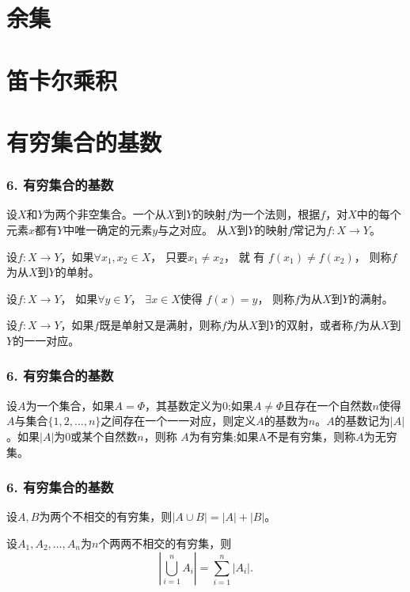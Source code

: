 \documentclass{beamer}
\begin{document}
\begin{CJK*}{UTF8}{gbsn}
\section{余集}
\section{笛卡尔乘积}
\section{有穷集合的基数}
\begin{frame}
  \frametitle{6. 有穷集合的基数}
  \begin{Def}
    设$X$和$Y$为两个非空集合。一个从$X$到$Y$的\alert{映射}$f$为一个法则，根据$f$，对$X$中的每个元素$x$都有$Y$中唯一确定的元素$y$与之对应。
    从$X$到$Y$的映射$f$常记为$f:X\to Y$。
  \end{Def}
    \begin{Def}
    设$f:X\to Y$，如果$\forall x_1, x_2 \in X$， 只要$x_1 \neq x_2$，  就 有 $f(x_1) \neq f(x_2)$，   则称$f$为从$X$到$Y$的\alert{单射}。
  \end{Def}
  \begin{Def}
    设$f:X\to Y$， 如果$\forall y \in Y$， $\exists x \in X$使得 $f(x) = y$， 则称$f$为从$X$到$Y$的\alert{满射}。
  \end{Def}
  \begin{Def}
    设$f:X\to Y$，如果$f$既是单射又是满射，则称$f$为从$X$到$Y$的\alert{双射}，或者称$f$为从$X$到$Y$的\alert{一一对应}。
  \end{Def}
\end{frame}

\begin{frame}
  \frametitle{6. 有穷集合的基数}

  \begin{Def}
设$A$为一个集合，如果$A=\Phi$，其\alert{基数}定义为$0$;如果$A \neq \Phi$且存在一个自然数$n$使得$A$与集合$\{1,2,\ldots, n\}$之间存在一个一一对应，则定义$A$的\alert{基数}为$n$。$A$的基数记为$|A|$。如果$|A|$为0或某个自然数$n$，则称
$A$为\alert{有穷集};如果A不是有穷集，则称$A$为\alert{无穷集}。   
  \end{Def}
\end{frame}

\begin{frame}
  \frametitle{6. 有穷集合的基数}
  \begin{Thm}
    设$A,B$为两个不相交的有穷集，则$|A \cup B| = |A| + |B|$。
  \end{Thm}
\pause
  \begin{Thm}
    设$A_1,A_2, \ldots, A_n$为$n$个两两不相交的有穷集，则\[|\bigcup_{i=1}^{n}A_i|=\sum_{i=1}^{n}|A_i|.\]
  \end{Thm}
\end{frame}


\end{CJK*}
\end{document}
